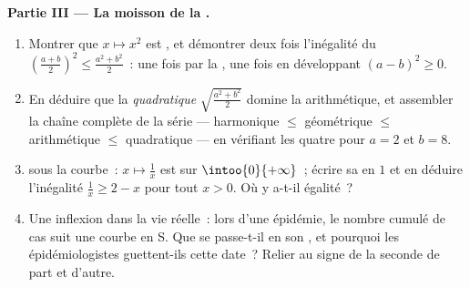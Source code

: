 \begin{problem}
\medskip
\noindent\textbf{Partie III --- La moisson de la .}
\begin{enumerate}[resume]
  \item Montrer que $x \mapsto x^2$ est , et démontrer deux
        fois l'inégalité du 
        $\left(\frac{a + b}{2}\right)^2 \leq
        \frac{a^2 + b^2}{2}$~: une fois par la , une fois
        en développant $(a - b)^2 \geq 0$.
  \item En déduire que la \emph{ quadratique}
        $\sqrt{\frac{a^2 + b^2}{2}}$ domine la 
        arithmétique, et assembler la chaîne complète de la série
        --- harmonique $\leq$ géométrique $\leq$ arithmétique
        $\leq$ quadratique --- en vérifiant les quatre pour $a = 2$
        et $b = 8$.
  \item {} sous la courbe~: $x \mapsto \frac1x$ est 
        sur $\intoo{0}{+\infty}$~; écrire sa  en $1$ et en
        déduire l'inégalité $\frac1x \geq 2 - x$ pour tout $x > 0$.
        Où y a-t-il égalité~?
  \item Une inflexion dans la vie réelle~: lors d'une épidémie, le
        nombre cumulé de cas suit une courbe en S. Que se passe-t-il
        en son , et pourquoi les épidémiologistes
        guettent-ils cette date~? Relier au signe de la 
        seconde de part et d'autre.
\end{enumerate}


\end{problem}
